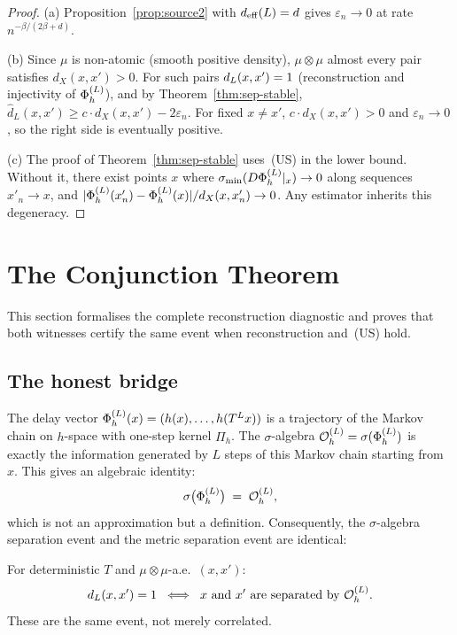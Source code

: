 \begin{proof}
(a) Proposition~\ref{prop:source2} with $d_{\mathrm{eff}}(L) = d$ gives
$\varepsilon_n \to 0$ at rate $n^{-\beta/(2\beta+d)}$.

(b) Since $\mu$ is non-atomic (smooth positive density), $\mu \otimes \mu$
almost every pair satisfies $d_X(x,x') > 0$.
For such pairs $d_{L}(x,x') = 1$ (reconstruction and injectivity of $\Phi_h^{(L)}$),
and by Theorem~\ref{thm:sep-stable}, $\widehat{d}_L(x,x') \geq c \cdot d_X(x,x') - 2\varepsilon_n$.
For fixed $x \neq x'$, $c \cdot d_X(x,x') > 0$ and $\varepsilon_n \to 0$,
so the right side is eventually positive.

(c) The proof of Theorem~\ref{thm:sep-stable} uses~(US) in the lower bound.
Without it, there exist points $x$ where $\sigma_{\min}(D\Phi_h^{(L)}|_x) \to 0$
along sequences $x'_n \to x$, and $|\Phi_h^{(L)}(x_n') - \Phi_h^{(L)}(x)| / d_X(x,x'_n) \to 0$.
Any estimator inherits this degeneracy.
\end{proof}

\section{The Conjunction Theorem}
\label{sec:conjunction}

This section formalises the complete reconstruction diagnostic and proves
that both witnesses certify the same event when reconstruction and~(US) hold.

\subsection{The honest bridge}

The delay vector $\Phi_h^{(L)}(x) = (h(x), \ldots, h(T^L x))$ is a trajectory of the
Markov chain on $h$-space with one-step kernel $\Pi_h$.
The $\sigma$-algebra $\mathcal{O}_h^{(L)} = \sigma(\Phi_h^{(L)})$ is exactly the information
generated by $L$ steps of this Markov chain starting from $x$.
This gives an algebraic identity:
\[
  \sigma\bigl(\Phi_h^{(L)}\bigr) \;=\; \mathcal{O}_h^{(L)},
\]
which is not an approximation but a definition.
Consequently, the $\sigma$-algebra separation event and the metric separation event
are identical:

\begin{lemma}
\label{lem:alg-metric}
For deterministic $T$ and $\mu \otimes \mu$-a.e.\ $(x, x')$:
\[
  d_{L}(x,x') = 1
  \;\iff\;
  \text{$x$ and $x'$ are separated by $\mathcal{O}_h^{(L)}$.}
\]
These are the same event, not merely correlated.
\end{lemma}

